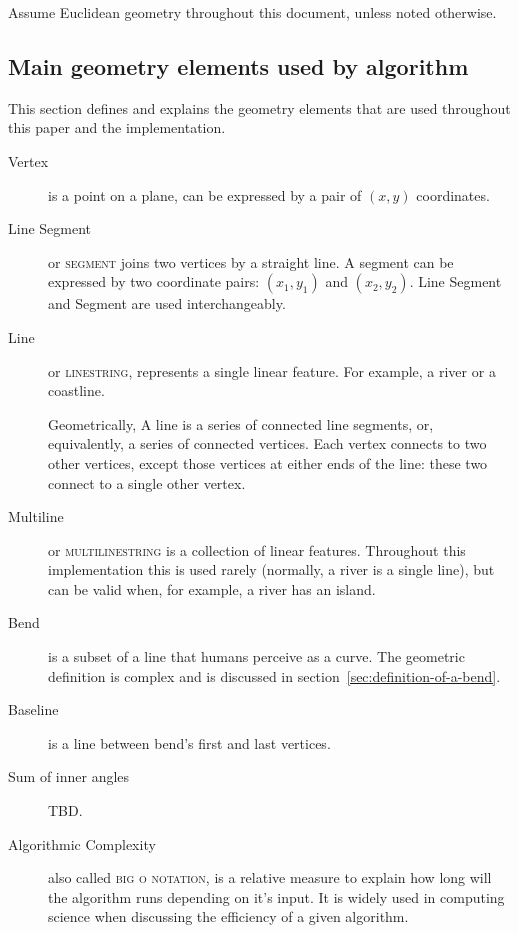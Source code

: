 \documentclass[a4paper]{article}
\begin{document}
Assume Euclidean geometry throughout this document, unless noted otherwise.

\subsection{Main geometry elements used by algorithm}
\label{sec:vocab}

This section defines and explains the geometry elements that are used
throughout this paper and the implementation.

\begin{description}

    \item[Vertex] is a point on a plane, can be expressed by a pair of $(x,y)$
        coordinates.

    \item[Line Segment] or \textsc{segment} joins two vertices by a straight
        line. A segment can be expressed by two coordinate pairs: $(x_1, y_1)$
        and $(x_2, y_2)$. Line Segment and Segment are used interchangeably.

    \item[Line] or \textsc{linestring}, represents a single linear feature. For
        example, a river or a coastline.

        Geometrically, A line is a series of connected line segments, or,
        equivalently, a series of connected vertices. Each vertex connects to
        two other vertices, except those vertices at either ends of the line:
        these two connect to a single other vertex.

    \item[Multiline] or \textsc{multilinestring} is a collection of linear
        features. Throughout this implementation this is used rarely (normally,
        a river is a single line), but can be valid when, for example, a river
        has an island.

    \item[Bend] is a subset of a line that humans perceive as a curve. The
        geometric definition is complex and is discussed in
        section~\ref{sec:definition-of-a-bend}.

    \item[Baseline] is a line between bend's first and last vertices.

    \item[Sum of inner angles] TBD.

    \item[Algorithmic Complexity] also called \textsc{big o notation}, is a
        relative measure to explain how long will the algorithm runs depending
        on it's input. It is widely used in computing science when discussing
        the efficiency of a given algorithm.


\end{description}
\end{document}
